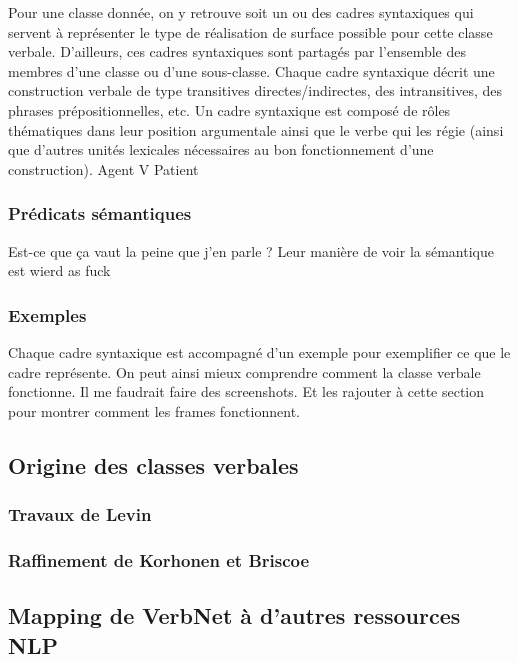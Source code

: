 \documentclass[12pt,maitrise,frenchb,natbib,twoside,initial]{dms}
\numberwithin{equation}{section}
\numberwithin{table}{chapter}
\numberwithin{figure}{chapter}
\begin{document}
Pour une classe donnée, on y retrouve soit un ou des cadres syntaxiques qui servent à représenter le type de réalisation de surface possible pour cette classe verbale. D'ailleurs, ces cadres syntaxiques sont partagés par l'ensemble des membres d'une classe ou d'une sous-classe. Chaque cadre syntaxique décrit une construction verbale de type transitives directes/indirectes, des intransitives, des phrases prépositionnelles, etc. Un cadre syntaxique est composé de rôles thématiques dans leur position argumentale ainsi que le verbe qui les régie (ainsi que d'autres unités lexicales nécessaires au bon fonctionnement d'une construction).
Agent V Patient

\subsubsection{Prédicats sémantiques}

Est-ce que ça vaut la peine que j'en parle ? Leur manière de voir la sémantique est wierd as fuck

\subsubsection{Exemples}

Chaque cadre syntaxique est accompagné d'un exemple pour exemplifier ce que le cadre représente. On peut ainsi mieux comprendre comment la classe verbale fonctionne. Il me faudrait faire des screenshots. Et les rajouter à cette section pour montrer comment les frames fonctionnent.

\subsection{Origine des classes verbales}

\subsubsection {Travaux de Levin}

\subsubsection {Raffinement de Korhonen et Briscoe}

\subsection {Mapping de VerbNet à d'autres ressources NLP} 
\end{document}

